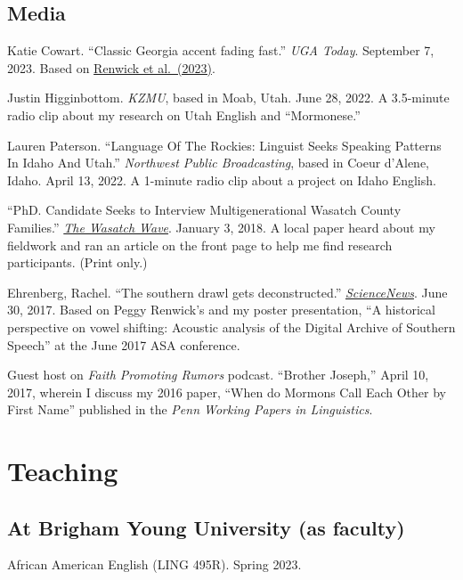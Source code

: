 \documentclass[
]{article}
\begin{document}
\hypertarget{media}{%
\subsection{Media}\label{media}}

Katie Cowart. ``Classic Georgia accent fading fast.'' \emph{UGA Today}.
September 7, 2023. Based on
\href{https://doi.org/10.1017/S095439452300011X}{Renwick et al.~(2023)}.

Justin Higginbottom. \emph{KZMU}, based in Moab, Utah. June 28, 2022. A
3.5-minute radio clip about my research on Utah English and
``Mormonese.''

Lauren Paterson. ``Language Of The Rockies: Linguist Seeks Speaking
Patterns In Idaho And Utah.'' \emph{Northwest Public Broadcasting},
based in Coeur d'Alene, Idaho. April 13, 2022. A 1-minute radio clip
about a project on Idaho English.

``PhD. Candidate Seeks to Interview Multigenerational Wasatch County
Families.'' \href{http://www.wasatchwave.com}{\emph{The Wasatch Wave}}.
January 3, 2018. A local paper heard about my fieldwork and ran an
article on the front page to help me find research participants. (Print
only.)

Ehrenberg, Rachel. ``The southern drawl gets deconstructed.''
\href{https://www.sciencenews.org}{\emph{ScienceNews}}. June 30, 2017.
Based on Peggy Renwick's and my poster presentation, ``A historical
perspective on vowel shifting: Acoustic analysis of the Digital Archive
of Southern Speech'' at the June 2017 ASA conference.

Guest host on \emph{Faith Promoting Rumors} podcast. ``Brother Joseph,''
April 10, 2017, wherein I discuss my 2016 paper, ``When do Mormons Call
Each Other by First Name'' published in the \emph{Penn Working Papers in
Linguistics}.

\hypertarget{teaching}{%
\section{Teaching}\label{teaching}}

\hypertarget{at-brigham-young-university-as-faculty}{%
\subsection{At Brigham Young University (as
faculty)}\label{at-brigham-young-university-as-faculty}}

African American English (LING 495R). Spring 2023.
\end{document}
